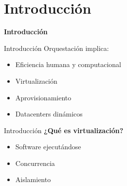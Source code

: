 \section{Introducción}

\begin{frame}
    \Huge
    \centering
    \textbf{Introducción}

\end{frame}


\begin{frame}{Introducción}
    \vspace{0cm}
    Orquestación implica:
    \begin{itemize}
        \item Eficiencia humana y computacional
        \item Virtualización
        \item Aprovisionamiento
        \item Datacenters dinámicos
    \end{itemize}
\end{frame}

\begin{frame}{Introducción}
    \vspace{0cm}
    \textbf{¿Qué es virtualización?}
    \begin{itemize}
        \item Software ejecutándose
        \item Concurrencia
        \item Aislamiento
    \end{itemize}



\end{frame}

